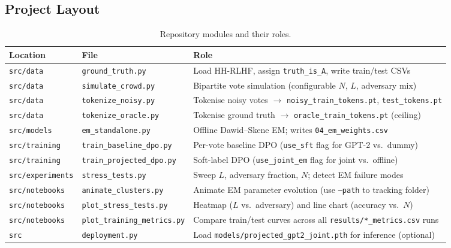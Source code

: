 \documentclass[11pt, a4paper]{article}
\begin{document}
\subsection{Project Layout}

\begin{table}[H]
  \centering
  \caption{Repository modules and their roles.}
  \label{tab:layout}
  \begin{tabular}{lll}
    \toprule
    \textbf{Location} & \textbf{File} & \textbf{Role} \\
    \midrule
    \texttt{src/data}        & \texttt{ground\_truth.py}         & Load HH-RLHF, assign \texttt{truth\_is\_A}, write train/test CSVs \\
    \texttt{src/data}        & \texttt{simulate\_crowd.py}       & Bipartite vote simulation (configurable $N$, $L$, adversary mix) \\
    \texttt{src/data}        & \texttt{tokenize\_noisy.py}       & Tokenise noisy votes $\to$ \texttt{noisy\_train\_tokens.pt}, \texttt{test\_tokens.pt} \\
    \texttt{src/data}        & \texttt{tokenize\_oracle.py}      & Tokenise ground truth $\to$ \texttt{oracle\_train\_tokens.pt} (ceiling) \\
    \texttt{src/models}      & \texttt{em\_standalone.py}        & Offline Dawid--Skene EM; writes \texttt{04\_em\_weights.csv} \\
    \texttt{src/training}    & \texttt{train\_baseline\_dpo.py}  & Per-vote baseline DPO (\texttt{use\_sft} flag for GPT-2 vs.\ dummy) \\
    \texttt{src/training}    & \texttt{train\_projected\_dpo.py} & Soft-label DPO (\texttt{use\_joint\_em} flag for joint vs.\ offline) \\
    \texttt{src/experiments} & \texttt{stress\_tests.py}         & Sweep $L$, adversary fraction, $N$; detect EM failure modes \\
    \texttt{src/notebooks}   & \texttt{animate\_clusters.py}     & Animate EM parameter evolution (use \texttt{--path} to tracking folder) \\
    \texttt{src/notebooks}   & \texttt{plot\_stress\_tests.py}   & Heatmap ($L$ vs.\ adversary) and line chart (accuracy vs.\ $N$) \\
    \texttt{src/notebooks}   & \texttt{plot\_training\_metrics.py} & Compare train/test curves across all \texttt{results/*\_metrics.csv} runs \\
    \texttt{src}             & \texttt{deployment.py}            & Load \texttt{models/projected\_gpt2\_joint.pth} for inference (optional) \\
    \bottomrule
  \end{tabular}
\end{table}
\end{document}
